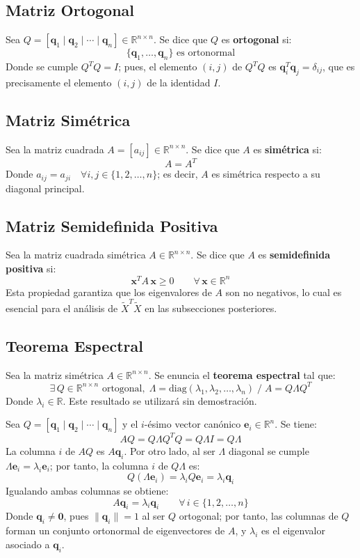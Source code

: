 \subsection{Matriz Ortogonal}

Sea $Q = [\mathbf{q}_1 \mid \mathbf{q}_2 \mid \cdots \mid \mathbf{q}_n]
\in \mathbb{R}^{n \times n}$. Se dice que $Q$ es \textbf{ortogonal} si:
\[
\{\mathbf{q}_1, \dots, \mathbf{q}_n\} \text{ es ortonormal}
\]
Donde se cumple $Q^TQ = I$; pues, el elemento $(i,j)$ de $Q^TQ$ es
$\mathbf{q}_i^T\mathbf{q}_j = \delta_{ij}$, que es precisamente el elemento
$(i,j)$ de la identidad $I$.


\subsection{Matriz Simétrica}

Sea la matriz cuadrada $A = [a_{ij}] \in \mathbb{R}^{n \times n}$. Se dice que $A$
es \textbf{simétrica} si:
\[
A = A^T
\]
Donde $a_{ij} = a_{ji} \quad \forall i, j \in \{1, 2, \dots, n\}$; es decir,
$A$ es simétrica respecto a su diagonal principal.


\subsection{Matriz Semidefinida Positiva}

Sea la matriz cuadrada simétrica $A \in \mathbb{R}^{n \times n}$. Se dice que
$A$ es \textbf{semidefinida positiva} si:
\[
\mathbf{x}^TA\,\mathbf{x} \geq 0 \qquad \forall \, \mathbf{x} \in \mathbb{R}^n
\]
Esta propiedad garantiza que los eigenvalores de $A$ son no negativos,
lo cual es esencial para el análisis de $\tilde{X}^T\tilde{X}$ en las subsecciones
posteriores.


\subsection{Teorema Espectral}

Sea la matriz simétrica $A \in \mathbb{R}^{n \times n}$. Se enuncia el
\textbf{teorema espectral} \cite[Thm.~4.1.5]{horn2013matrix} tal que:
\[
\exists \, Q \in \mathbb{R}^{n \times n} \text{ ortogonal}, \;
\Lambda = \text{diag}(\lambda_1, \lambda_2, \dots, \lambda_n) \;/\;
A = Q\Lambda Q^T
\]
Donde $\lambda_i \in \mathbb{R}$. Este resultado se utilizará sin demostración.

Sea $Q = [\mathbf{q}_1 \mid \mathbf{q}_2 \mid \cdots \mid \mathbf{q}_n]$ y 
el $i$-ésimo vector canónico $\mathbf{e}_i \in \mathbb{R}^n$. Se tiene:
\[
AQ = Q\Lambda Q^TQ = Q\Lambda I = Q\Lambda
\]
La columna $i$ de $AQ$ es $A\mathbf{q}_i$. Por otro lado, al ser $\Lambda$ diagonal
se cumple $\Lambda\mathbf{e}_i = \lambda_i\mathbf{e}_i$; por tanto, la columna $i$
de $Q\Lambda$ es:
\[
Q(\Lambda\mathbf{e}_i) = \lambda_i Q\mathbf{e}_i = \lambda_i\mathbf{q}_i
\]
Igualando ambas columnas se obtiene:
\[
A\mathbf{q}_i = \lambda_i\mathbf{q}_i \qquad \forall \, i \in \{1, 2, \dots, n\}
\]
Donde $\mathbf{q}_i \neq \mathbf{0}$, pues $\|\mathbf{q}_i\| = 1$ al ser $Q$ ortogonal;
por tanto, las columnas de $Q$ forman un conjunto ortonormal de eigenvectores
de $A$, y $\lambda_i$ es el eigenvalor asociado a $\mathbf{q}_i$.


